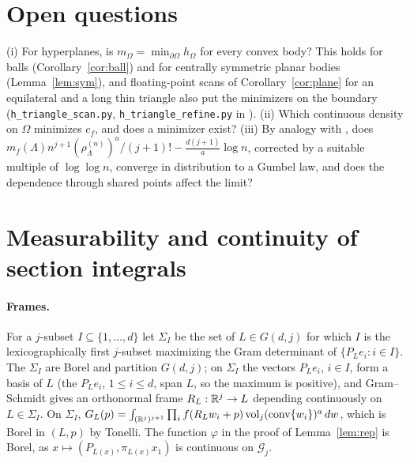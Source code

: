 \documentclass[11pt]{article}
\begin{document}
\section{Open questions}\label{sec:remarks}

(i) For hyperplanes, is $m_\Omega=\min_{\partial\Omega}h_\Omega$ for every convex body? This holds for balls (Corollary~\ref{cor:ball}) and
for centrally symmetric planar bodies (Lemma~\ref{lem:sym}), and floating-point scans of Corollary~\ref{cor:plane} for an equilateral
and a long thin triangle also put the minimizers on the boundary (\texttt{h\_triangle\_scan.py}, \texttt{h\_triangle\_refine.py} in
\cite{Repo}). (ii) Which continuous density on $\Omega$ minimizes $c_f$, and does a minimizer exist? (iii) By analogy with
\cite{Janson86}, does $m_f(\Lambda)n^{j+1}(\rho_\Lambda^{(n)})^a/(j+1)!-\frac{d(j+1)}a\log n$, corrected by a suitable multiple of $\log\log n$,
converge in distribution to a Gumbel law, and does the dependence through shared points affect the limit?

\appendix
\section{Measurability and continuity of section integrals}\label{app:meas}

\paragraph{Frames.} For a $j$-subset $I\subseteq\{1,\dots,d\}$ let $\Sigma_I$ be the set of $L\in G(d,j)$ for which $I$ is the
lexicographically first $j$-subset maximizing the Gram determinant of $\{P_Le_i:i\in I\}$. The $\Sigma_I$ are Borel and partition
$G(d,j)$; on $\Sigma_I$ the vectors $P_Le_i$, $i\in I$, form a basis of $L$ (the $P_Le_i$, $1\le i\le d$, span $L$, so the maximum is
positive), and Gram--Schmidt gives an orthonormal frame $R_L:\mathbb{R}^j\to L$ depending continuously on $L\in\Sigma_I$. On $\Sigma_I$,
$G_L(p)=\int_{(\mathbb{R}^j)^{j+1}}\prod_if(R_Lw_i+p)\operatorname{vol}_j(\operatorname{conv}\{w_i\})^a\,dw$, which is Borel in $(L,p)$ by Tonelli. The function $\varphi$ in
the proof of Lemma~\ref{lem:rep} is Borel, as $x\mapsto(P_{L(x)},\pi_{L(x)}x_1)$ is continuous on $\mathcal G_j$.
\end{document}
